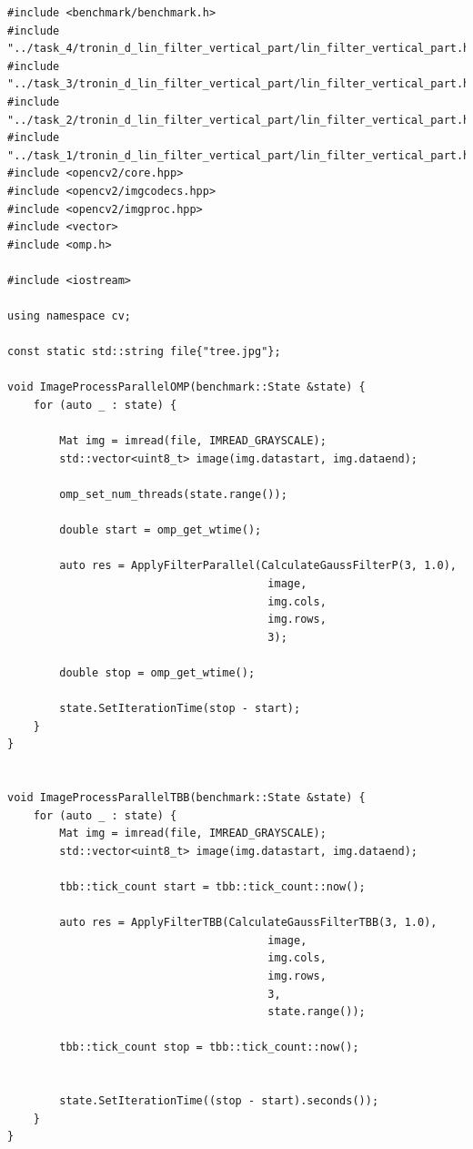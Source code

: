 \documentclass{report}
\begin{document}
\begin{lstlisting}[breaklines=true]
#include <benchmark/benchmark.h>
#include "../task_4/tronin_d_lin_filter_vertical_part/lin_filter_vertical_part.h"
#include "../task_3/tronin_d_lin_filter_vertical_part/lin_filter_vertical_part.h"
#include "../task_2/tronin_d_lin_filter_vertical_part/lin_filter_vertical_part.h"
#include "../task_1/tronin_d_lin_filter_vertical_part/lin_filter_vertical_part.h"
#include <opencv2/core.hpp>
#include <opencv2/imgcodecs.hpp>
#include <opencv2/imgproc.hpp>
#include <vector>
#include <omp.h>

#include <iostream>

using namespace cv;

const static std::string file{"tree.jpg"};

void ImageProcessParallelOMP(benchmark::State &state) {
    for (auto _ : state) {

        Mat img = imread(file, IMREAD_GRAYSCALE);
        std::vector<uint8_t> image(img.datastart, img.dataend);

        omp_set_num_threads(state.range());

        double start = omp_get_wtime();

        auto res = ApplyFilterParallel(CalculateGaussFilterP(3, 1.0),
                                        image,
                                        img.cols,
                                        img.rows,
                                        3);

        double stop = omp_get_wtime();

        state.SetIterationTime(stop - start);
    }
}


void ImageProcessParallelTBB(benchmark::State &state) {
    for (auto _ : state) {
        Mat img = imread(file, IMREAD_GRAYSCALE);
        std::vector<uint8_t> image(img.datastart, img.dataend);

        tbb::tick_count start = tbb::tick_count::now();

        auto res = ApplyFilterTBB(CalculateGaussFilterTBB(3, 1.0),
                                        image,
                                        img.cols,
                                        img.rows,
                                        3,
                                        state.range());

        tbb::tick_count stop = tbb::tick_count::now();


        state.SetIterationTime((stop - start).seconds());
    }
}



\end{lstlisting}
\end{document}
